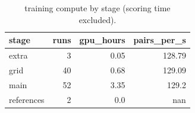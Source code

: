 \begin{table}[t]
\centering
\caption{training compute by stage (scoring time excluded).}
\begin{tabular}{l r r r}
\toprule
stage & runs & gpu\_hours & pairs\_per\_s \\
\midrule
extra & 3 & 0.05 & 128.79 \\
grid & 40 & 0.68 & 129.09 \\
main & 52 & 3.35 & 129.2 \\
references & 2 & 0.0 & nan \\
\bottomrule
\end{tabular}
\end{table}
